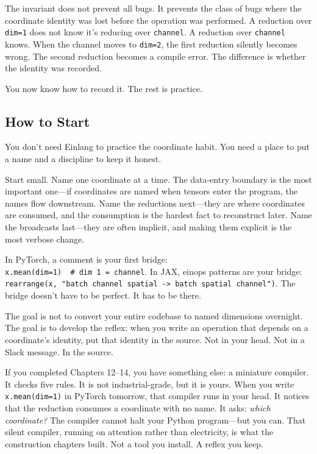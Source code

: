 \documentclass[11pt,titlepage]{article}
\begin{document}
The invariant does not prevent all bugs. It prevents the class of bugs
where the coordinate identity was lost before the operation was
performed. A reduction over \texttt{dim=1} does not know it's reducing
over \texttt{channel}. A reduction over \texttt{channel} knows. When the
channel moves to \texttt{dim=2}, the first reduction silently becomes
wrong. The second reduction becomes a compile error. The difference is
whether the identity was recorded.

You now know how to record it. The rest is practice.

\vspace{2em}

\hypertarget{how-to-start}{%
\subsection{How to Start}\label{how-to-start}}

You don't need Einlang to practice the coordinate habit. You need a
place to put a name and a discipline to keep it honest.

Start small. Name one coordinate at a time. The data-entry boundary is
the most important one---if coordinates are named when tensors enter the
program, the names flow downstream. Name the reductions next---they are
where coordinates are consumed, and the consumption is the hardest fact
to reconstruct later. Name the broadcasts last---they are often
implicit, and making them explicit is the most verbose change.

In PyTorch, a comment is your first bridge:
\texttt{x.mean(dim=1)\ \ \#\ dim\ 1\ =\ channel}. In JAX, einops
patterns are your bridge:
\texttt{rearrange(x,\ "batch\ channel\ spatial\ -\textgreater{}\ batch\ spatial\ channel")}.
The bridge doesn't have to be perfect. It has to be there.

The goal is not to convert your entire codebase to named dimensions
overnight. The goal is to develop the reflex: when you write an
operation that depends on a coordinate's identity, put that identity in
the source. Not in your head. Not in a Slack message. In the source.

If you completed Chapters 12--14, you have something else: a miniature
compiler. It checks five rules. It is not industrial-grade, but it is
yours. When you write \texttt{x.mean(dim=1)} in PyTorch tomorrow, that
compiler runs in your head. It notices that the reduction consumes a
coordinate with no name. It asks: \emph{which coordinate?} The compiler
cannot halt your Python program---but you can. That silent compiler,
running on attention rather than electricity, is what the construction
chapters built. Not a tool you install. A reflex you keep.
\end{document}
